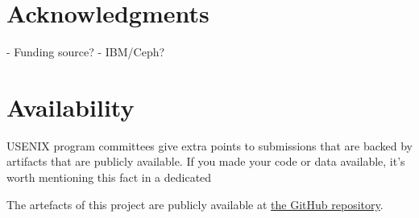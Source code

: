 \section*{Acknowledgments}

- Funding source?
- IBM/Ceph?

\section*{Availability}

USENIX program committees give extra points to submissions that are
backed by artifacts that are publicly available. If you made your code
or data available, it's worth mentioning this fact in a dedicated

The artefacts of this project are publicly available at 
\href{https://github.com/CCI-MOC/lsvd-rbd}{the GitHub repository}.

